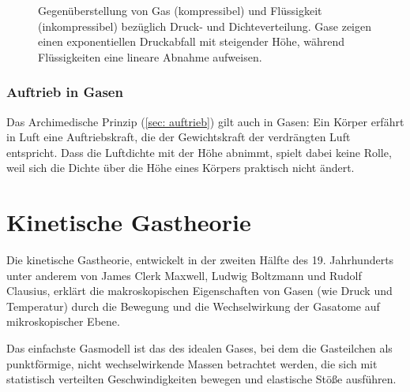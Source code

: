 \begin{figure}[tb]
{
    }
    \caption{Gegenüberstellung von Gas (kompressibel) und Flüssigkeit (inkompressibel) bezüglich Druck- und Dichteverteilung. Gase zeigen einen exponentiellen Druckabfall mit steigender Höhe, während Flüssigkeiten eine lineare Abnahme aufweisen.}\label{fig: gassaeule_fluessigkeit_gegenueberstellung}
\end{figure}

\subsubsection{Auftrieb in Gasen}
Das Archimedische Prinzip (\cref{sec: auftrieb}) gilt auch in Gasen: Ein Körper erfährt in Luft eine Auftriebskraft, die der Gewichtskraft der verdrängten Luft entspricht. Dass die Luftdichte mit der Höhe abnimmt, spielt dabei keine Rolle, weil sich die Dichte über die Höhe eines Körpers praktisch nicht ändert.


\section{Kinetische Gastheorie}\label{sec: kinetische_gastheorie}
Die kinetische Gastheorie, entwickelt in der zweiten Hälfte des 19. Jahrhunderts unter anderem von James Clerk Maxwell, Ludwig Boltzmann und Rudolf Clausius, erklärt die makroskopischen Eigenschaften von Gasen (wie Druck und Temperatur) durch die Bewegung und die Wechselwirkung der Gasatome auf mikroskopischer Ebene.

Das einfachste Gasmodell ist das des idealen Gases, bei dem die Gasteilchen als punktförmige, nicht wechselwirkende Massen betrachtet werden, die sich mit statistisch verteilten Geschwindigkeiten bewegen und elastische Stöße ausführen.
